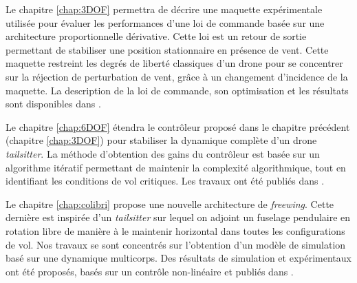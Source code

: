Le chapitre \ref{chap:3DOF} permettra de décrire une maquette expérimentale utilisée pour évaluer les performances d'une loi de commande basée sur une architecture proportionnelle dérivative. Cette loi est un retour de sortie permettant de stabiliser une position stationnaire en présence de vent. Cette maquette restreint les degrés de liberté classiques d'un drone pour se concentrer sur la réjection de perturbation de vent, grâce à un changement d'incidence de la maquette. La description de la loi de commande, son optimisation et les résultats sont disponibles dans \cite{SANSOUACA}.

Le chapitre \ref{chap:6DOF} étendra le contrôleur proposé dans le chapitre précédent (chapitre \ref{chap:3DOF}) pour stabiliser la dynamique complète d'un drone \textit{tailsitter}. La méthode d'obtention des gains du contrôleur est basée sur un algorithme itératif permettant de maintenir la complexité algorithmique, tout en identifiant les conditions de vol critiques. Les travaux ont été publiés dans \cite{sansouTCST}.

Le chapitre \ref{chap:colibri} propose une nouvelle architecture de \textit{freewing}. Cette dernière est inspirée d'un \textit{tailsitter} sur lequel on adjoint un fuselage pendulaire en rotation libre de manière à le maintenir horizontal dans toutes les configurations de vol. Nos travaux se sont concentrés sur l'obtention d'un modèle de simulation basé sur une dynamique multicorps. Des résultats de simulation et expérimentaux ont été proposés, basés sur un contrôle non-linéaire et publiés dans \cite{sansouICUAS}.



